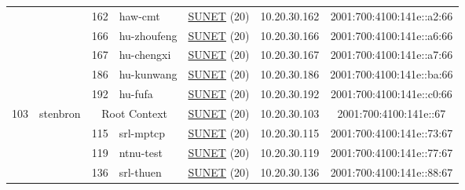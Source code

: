 \begin{small}
\begin{center}
\begin{longtable}{|c|c|c|c|c|c|c|c|}
  &  & \tiny{162} & \multicolumn{1}{|l|}{\tiny{haw-cmt}} & \multicolumn{2}{|c|}{\tiny{\href{http://www.sunet.se}{SUNET} (20)}} & \tiny{10.20.30.162} & \tiny{2001:700:4100:141e::a2:66} \\* \cline{3-3}\cline{4-4}\cline{5-5}\cline{6-6}\cline{7-7}\cline{8-8}
  &  & \tiny{166} & \multicolumn{1}{|l|}{\tiny{hu-zhoufeng}} & \multicolumn{2}{|c|}{\tiny{\href{http://www.sunet.se}{SUNET} (20)}} & \tiny{10.20.30.166} & \tiny{2001:700:4100:141e::a6:66} \\* \cline{3-3}\cline{4-4}\cline{5-5}\cline{6-6}\cline{7-7}\cline{8-8}
  &  & \tiny{167} & \multicolumn{1}{|l|}{\tiny{hu-chengxi}} & \multicolumn{2}{|c|}{\tiny{\href{http://www.sunet.se}{SUNET} (20)}} & \tiny{10.20.30.167} & \tiny{2001:700:4100:141e::a7:66} \\* \cline{3-3}\cline{4-4}\cline{5-5}\cline{6-6}\cline{7-7}\cline{8-8}
  &  & \tiny{186} & \multicolumn{1}{|l|}{\tiny{hu-kunwang}} & \multicolumn{2}{|c|}{\tiny{\href{http://www.sunet.se}{SUNET} (20)}} & \tiny{10.20.30.186} & \tiny{2001:700:4100:141e::ba:66} \\* \cline{3-3}\cline{4-4}\cline{5-5}\cline{6-6}\cline{7-7}\cline{8-8}
  &  & \tiny{192} & \multicolumn{1}{|l|}{\tiny{hu-fufa}} & \multicolumn{2}{|c|}{\tiny{\href{http://www.sunet.se}{SUNET} (20)}} & \tiny{10.20.30.192} & \tiny{2001:700:4100:141e::c0:66} \\ \hline
 \multirow{9}{*}{\tiny{103}} & \multicolumn{1}{|l|}{\multirow{9}{*}{\tiny{stenbron}}} & \multicolumn{2}{|c|}{\tiny{Root Context}} & \multicolumn{2}{|c|}{\tiny{\href{http://www.sunet.se}{SUNET} (20)}} & \tiny{10.20.30.103} & \tiny{2001:700:4100:141e::67} \\* \cline{3-3}\cline{4-4}\cline{5-5}\cline{6-6}\cline{7-7}\cline{8-8}
  &  & \tiny{115} & \multicolumn{1}{|l|}{\tiny{srl-mptcp}} & \multicolumn{2}{|c|}{\tiny{\href{http://www.sunet.se}{SUNET} (20)}} & \tiny{10.20.30.115} & \tiny{2001:700:4100:141e::73:67} \\* \cline{3-3}\cline{4-4}\cline{5-5}\cline{6-6}\cline{7-7}\cline{8-8}
  &  & \tiny{119} & \multicolumn{1}{|l|}{\tiny{ntnu-test}} & \multicolumn{2}{|c|}{\tiny{\href{http://www.sunet.se}{SUNET} (20)}} & \tiny{10.20.30.119} & \tiny{2001:700:4100:141e::77:67} \\* \cline{3-3}\cline{4-4}\cline{5-5}\cline{6-6}\cline{7-7}\cline{8-8}
  &  & \tiny{136} & \multicolumn{1}{|l|}{\tiny{srl-thuen}} & \multicolumn{2}{|c|}{\tiny{\href{http://www.sunet.se}{SUNET} (20)}} & \tiny{10.20.30.136} & \tiny{2001:700:4100:141e::88:67} \\* \cline{3-3}\cline{4-4}\cline{5-5}\cline{6-6}\cline{7-7}\cline{8-8}

\end{longtable}
\end{center}
\end{small}
